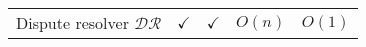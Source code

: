 \begin{table*}[ht]
\begin{center}
{\begin{tabular}{|c|c|c|c|c|}
 \scriptsize Dispute resolver $\mathcal{DR}$&\scriptsize$\checkmark$&\scriptsize$\checkmark$& \cellcolor{gray!20}\scriptsize $O(n)$&    \cellcolor{gray!20}\scriptsize$O(1)$\\
 
    \cline{1-5}  




 
 
\end{tabular}  %

}
\end{center}
\end{table*}




